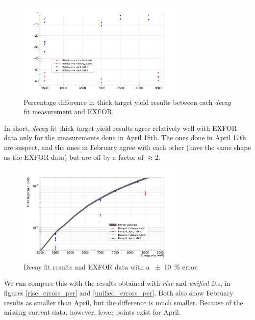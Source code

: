 \documentclass[a4paper,12pt]{report}
\begin{document}
\begin{figure}[H]
	\centering
	\includegraphics[width=0.75\textwidth]{decay_errors_per.png}
	\caption{Percentage difference in thick target yield results between each \textit{decay} fit measurement and EXFOR.}
	\label{decay_errors_per}
\end{figure}

In short, \textit{decay} fit thick target yield results agree relatively well with EXFOR data only for the measurements done in April 18th.
The ones done in April 17th are suspect, and the ones in February agree with each other (have the same shape as the EXFOR data) but are off by a factor of $\approx 2$.

\begin{figure}[H]
	\centering
	\includegraphics[width=0.75\textwidth]{reactions_v_energy_decay.png}
	\caption{Decay fit results and EXFOR data with a \qty{\pm 10}{\percent} error.}
	\label{reactions_v_energy_decay}
\end{figure}

We can compare this with the results obtained with \textit{rise} and \textit{unified} fits, in figures \ref{rise_errors_per} and \ref{unified_errors_per}.
Both also show February results as smaller than April, but the difference is much smaller.
Because of the missing current data, however, fewer points exist for April.
\end{document}
